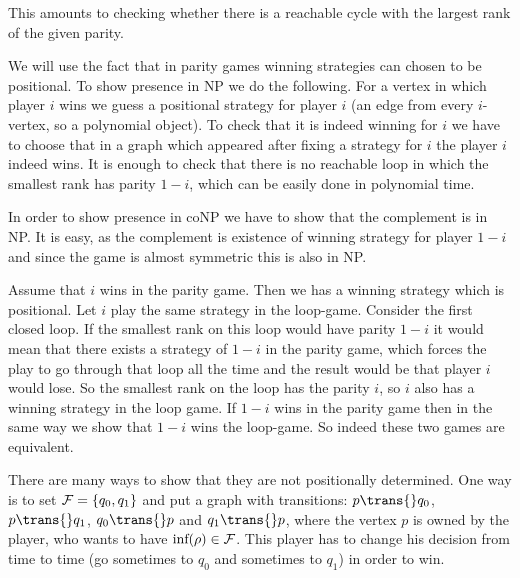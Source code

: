 {
This amounts to checking whether there is a reachable cycle with the largest
rank of the given parity.
}



{
We will use the fact that in parity games winning strategies can chosen to be positional.
To show presence in \textup{NP} we do the following.
For a vertex in which player $i$ wins we guess a positional strategy for player $i$ (an edge
from every $i$-vertex, so a polynomial object). To check that it is indeed winning for $i$ we have to choose
that in a graph which appeared after fixing a strategy for $i$ the player $i$ indeed wins. It is enough to check
that there is no reachable loop in which the smallest rank has parity $1-i$, which can be easily done in polynomial
time.

In order to show presence in \textup{coNP} we have to show that the complement is in \textup{NP}.
It is easy, as the complement is existence of winning strategy for player $1-i$ and since the game is almost symmetric
this is also in \textup{NP}.
}



{
Assume that $i$ wins in the parity game. Then we has a winning strategy which is positional.
Let $i$ play the same strategy in the loop-game. Consider the first closed loop. If the smallest
rank on this loop would have parity $1-i$ it would mean that there exists a strategy of $1-i$
in the parity game, which forces the play to go through that loop all the time and the result would be
that player $i$ would lose. So the smallest rank on the loop has the parity $i$, so $i$ also has a winning strategy
in the loop game.
If $1-i$ wins in the parity game then in the same way we show that $1-i$ wins the loop-game. So indeed these
two games are equivalent.
}



{
There are many ways to show that they are not positionally determined.
One way is to set $\mathcal F = \{q_0, q_1\}$ and put a graph with transitions:
$p \trans{} q_0$, $p \trans{} q_1$, $q_0 \trans{} p$ and $q_1 \trans{} p$, where the vertex $p$ is owned by the player,
who wants to have $\textup{inf}(\rho) \in \mathcal F$. This player has to change his decision from time to time (go sometimes to $q_0$
and sometimes to $q_1$) in order to win.

}



